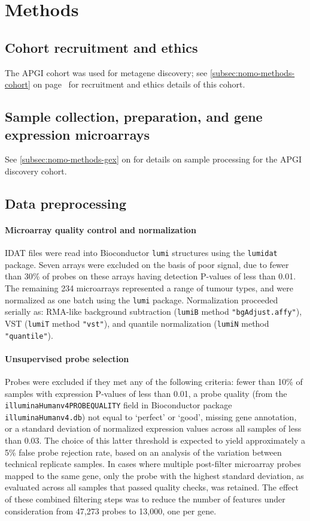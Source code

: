 \documentclass[dissertation.tex]{subfiles}
\begin{document}
\section{Methods}
\subsection{Cohort recruitment and ethics}
The \gls{APGI} cohort was used for metagene discovery; see \cref{subsec:nomo-methods-cohort} on page~\pageref{subsec:nomo-methods-cohort} for recruitment and ethics details of this cohort.

\subsection{Sample collection, preparation, and gene expression microarrays}
See \cref{subsec:nomo-methods-gex} on  for details on sample processing for the \gls{APGI} discovery cohort.

\subsection{Data preprocessing}
\paragraph{Microarray quality control and normalization}
\gls{IDAT} files were read into Bioconductor \texttt{lumi} structures using the \texttt{lumidat} package.  Seven arrays were excluded on the basis of poor signal, due to fewer than 30\% of probes on these arrays having detection P-values of less than 0.01.  The remaining 234 microarrays represented a range of tumour types, and were normalized as one batch using the \texttt{lumi} package.  Normalization proceeded serially as: RMA-like background subtraction (\texttt{lumiB} method \texttt{"bgAdjust.affy"}), \gls{VST} (\texttt{lumiT} method \texttt{"vst"}), and quantile normalization (\texttt{lumiN} method \texttt{"quantile"}).

\paragraph{Unsupervised probe selection}
Probes were excluded if they met any of the following criteria: fewer than 10\% of samples with expression P-values of less than 0.01, a probe quality (from the \texttt{illuminaHumanv4PROBEQUALITY} field in Bioconductor package \texttt{illuminaHumanv4.db}) not equal to `perfect' or `good', missing gene annotation, or a standard deviation of normalized expression values across all samples of less than 0.03.  The choice of this latter threshold is expected to yield approximately a 5\% false probe rejection rate, based on an analysis of the variation between technical replicate samples.  In cases where multiple post-filter microarray probes mapped to the same gene, only the probe with the highest standard deviation, as evaluated across all samples that passed quality checks, was retained.  The effect of these combined filtering steps was to reduce the number of features under consideration from 47,273 probes to 13,000, one per gene.
\end{document}
